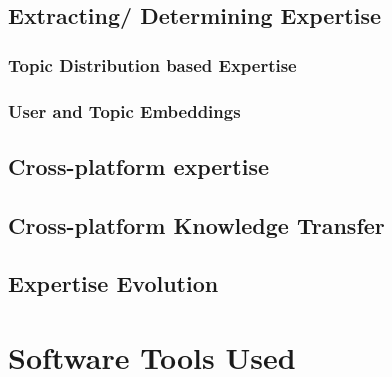     \subsection{Extracting/ Determining Expertise}
    
        \subsubsection{Topic Distribution based Expertise}
        
        \subsubsection{User and Topic Embeddings}
        
        
    \subsection{Cross-platform expertise}
    \subsection{Cross-platform Knowledge Transfer}
    \subsection{Expertise Evolution}

\section{Software Tools Used}



    
